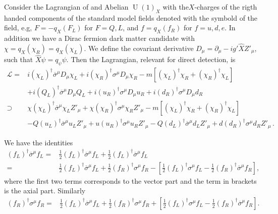 Consider the Lagrangian of and Abelian $\operatorname{U}(1)_X$ with
the$X$-charges of the rigth handed components of the standard model
fields denoted with the symbold of the field, e.g,
$F=-q_X \left(  F_L  \right)$ for $F=Q,L$, and
$f=q_X \left( f_R \right) $ for $f=u,d,e$. In addition we have a Dirac
fermion dark matter candidate with
$\chi =q_X \left( \chi_R \right)=q_X \left( \chi_L \right)$. We
define the covariant derivative
$D_{\mu}=\partial_{\mu} -i g' \widehat{X} Z'_{\mu}$, such that
$\widehat{X}\psi=q_{\psi}\psi$. Then the Lagrangian, relevant for direct detection, is
\begin{align*}
  \mathcal{L}=&i \left( \chi_L \right)^{\dagger} \overline{\sigma}^{\mu} D_{\mu} \chi_L
                +i \left( \chi_R \right)^{\dagger} {\sigma}^{\mu} D_{\mu} \chi_R
                -m \left[\left( \chi_L \right)^{\dagger} \chi_R+\left( \chi_R \right)^{\dagger} \chi_L\right]
                \nonumber\\
                &
                + i \left( Q_L \right)^{\dagger} \overline{\sigma}^{\mu} D_{\mu} Q_L
                +i \left( u_R \right)^{\dagger} {\sigma}^{\mu} D_{\mu} u_R
                +i \left( d_R \right)^{\dagger} {\sigma}^{\mu} D_{\mu} d_R
                 \nonumber\\ %
  \supset& \chi \left( \chi_L \right)^{\dagger}  \overline{\sigma}^{\mu}\chi_L Z'_{\mu}
           +\chi\left( \chi_R \right)^{\dagger} {\sigma}^{\mu}  \chi_R Z'_{\mu}-m \left[\left( \chi_L \right)^{\dagger} \chi_R+
                \left( \chi_R \right)^{\dagger} \chi_L\right] \nonumber\\
  &-Q \left( u_L \right)^{\dagger} \overline{\sigma}^{\mu} u_L Z'_{\mu}
    +u \left( u_R \right)^{\dagger} {\sigma}^{\mu}  u_R Z'_{\mu}
-Q \left( d_L \right)^{\dagger} \overline{\sigma}^{\mu} d_L Z'_{\mu}
  +d \left( d_R \right)^{\dagger} {\sigma}^{\mu}  d_R Z'_{\mu}\,.
\end{align*}

We have the identities
\begin{align}
  \left( f_{L} \right)^{\dagger}\overline{\sigma}^{\mu} f_L=&  \frac{1}{2}\left( f_{L} \right)^{\dagger}\overline{\sigma}^{\mu} f_L
                                                        + \frac{1}{2}\left( f_{L} \right)^{\dagger}\overline{\sigma}^{\mu} f_L \nonumber\\
  =&  \frac{1}{2}\left( f_L \right)^{\dagger}\overline{\sigma}^{\mu} f_L+\frac{1}{2}\left( f_R \right)^{\dagger}{\sigma}^{\mu} f_R
     -\left[ \frac{1}{2}\left( f_L \right)^{\dagger}{\sigma}^{\mu} f_L- \frac{1}{2}\left( f_R \right)^{\dagger}\overline{\sigma}^{\mu} f_R \right],
\end{align}
where the first two terms corresponds to the vector part and the term in brackets is the axial part. Similarly
\begin{align}
   \left( f_{R} \right)^{\dagger}{\sigma}^{\mu} f_R  =&  \frac{1}{2}\left( f_L \right)^{\dagger}\overline{\sigma}^{\mu} f_L+\frac{1}{2}\left( f_R \right)^{\dagger}{\sigma}^{\mu} f_R
     +\left[ \frac{1}{2}\left( f_L \right)^{\dagger}{\sigma}^{\mu} f_L- \frac{1}{2}\left( f_R \right)^{\dagger}\overline{\sigma}^{\mu} f_R \right].
\end{align}

